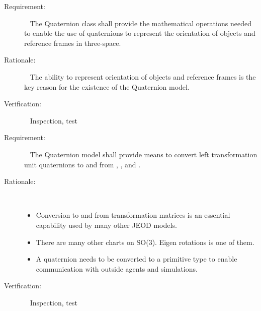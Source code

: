 \label{reqt:orient}
\begin{description}
\item[Requirement:]\ \newline
  The Quaternion class shall provide the mathematical operations needed to
  enable the use of quaternions to represent the orientation of objects  
  and reference frames in three-space.

\item[Rationale:]\ \newline
  The ability to represent orientation of objects and reference frames
  is the key reason for the existence of the Quaternion model.

\item[Verification:]\ \newline
  Inspection, test
\end{description}


\label{reqt:conversion}
\begin{description}
\item[Requirement:]\ \newline
  The Quaternion model shall provide means to convert left transformation
  unit quaternions to and from
  \label{reqt:xform_convert},
  \label{reqt:eigen_convert}, and
  \label{reqt:fourvec_convert}.

\item[Rationale:]\ \newline
  \begin{itemize}
  \item Conversion to and from transformation matrices is an essential
    capability used by many other JEOD models.
  \item There are many other charts on SO(3). Eigen rotations is one of
    them.
  \item A quaternion needs to be converted to a primitive type to enable
    communication with outside agents and simulations.
  \end{itemize}

\item[Verification:]\ \newline
  Inspection, test
\end{description}
